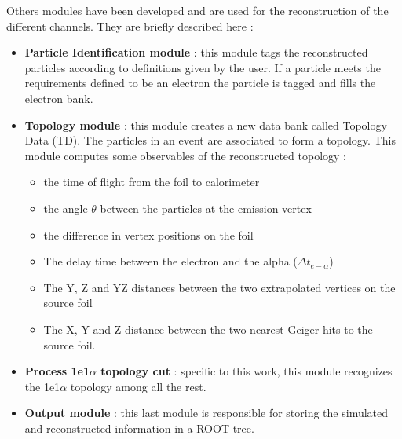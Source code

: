 \documentclass[main.tex]{subfiles}
\begin{document}
\noindent Others modules have been developed and are used for the reconstruction of the different channels. They are briefly described here :


\begin{itemize}


\item \textbf{Particle Identification module} : this module tags the reconstructed particles according to definitions given by the user. If a particle meets the requirements defined to be an electron the particle is tagged and fills the electron bank. %


\item \textbf{Topology module} : this module creates a new data bank called Topology Data (TD). The particles in an event are associated to form a topology. This module computes some observables of the reconstructed topology : 

 
\begin{itemize}


\item the time of flight from the foil to calorimeter
\item the angle $\theta$ between the particles at the emission vertex
\item the difference in vertex positions on the foil
\item The delay time between the electron and the alpha ($\Delta t_{e-\alpha}$)
\item The Y, Z and YZ distances between the two extrapolated vertices on the source foil
\item The X, Y and Z distance between the two nearest Geiger hits to the source foil.


\end{itemize}


\item \textbf{Process 1e1$\alpha$ topology cut} : specific to this work, this module recognizes the 1e1$\alpha$ topology among all the rest.%


\item \textbf{Output module} : this last module is responsible for storing the simulated and reconstructed information in a ROOT tree.


\end{itemize}


\FloatBarrier
\end{document}

